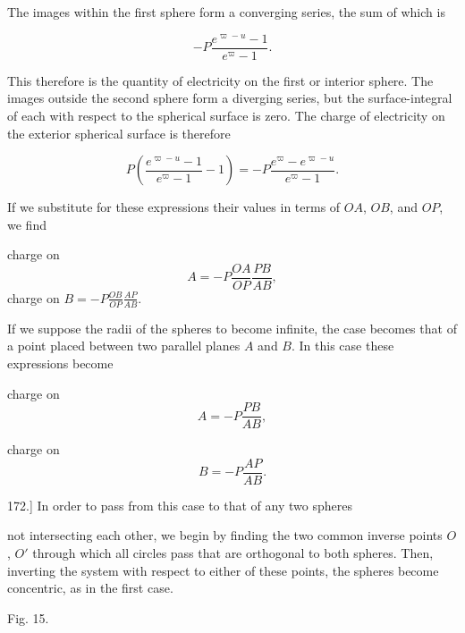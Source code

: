 \documentclass[11pt,a4paper]{article}
\begin{document}
The images within the first sphere form a converging series, the sum
of which is

\[
-P\frac{e^{\varpi-u}-1}{e^{\varpi}-1}.
\]

This therefore is the quantity of electricity on the first or interior
sphere. The images outside the second sphere form a diverging series,
but the surface-integral of each with respect to the spherical surface
is zero. The charge of electricity on the exterior spherical surface is
therefore

\[
P\left(\frac{e^{\varpi-u}-1}{e^\varpi-1}-1\right)
=-P\frac{e^\varpi-e^{\varpi-u}}{e^\varpi-1}.
\]

If we substitute for these expressions their values in terms of $OA$,
$OB$, and $OP$, we find

charge on
\[
A=-P\frac{OA}{OP}\frac{PB}{AB},
\]
charge on $B=-P\frac{OB}{OP}\frac{AP}{AB}$.

If we suppose the radii of the spheres to become infinite, the case
becomes that of a point placed between two parallel planes $A$ and $B$.
In this case these expressions become

charge on
\[
A=-P\frac{PB}{AB},
\]

charge on
\[
B=-P\frac{AP}{AB}.
\]

172.] In order to pass from this case to that of any two spheres

not intersecting each other, we begin by finding the two common inverse
points $O$, $O'$ through which all circles pass that are orthogonal to
both spheres. Then, inverting the system with respect to either of
these points, the spheres become concentric, as in the first case.

\begin{center}

Fig. 15.
\end{center}
\end{document}

